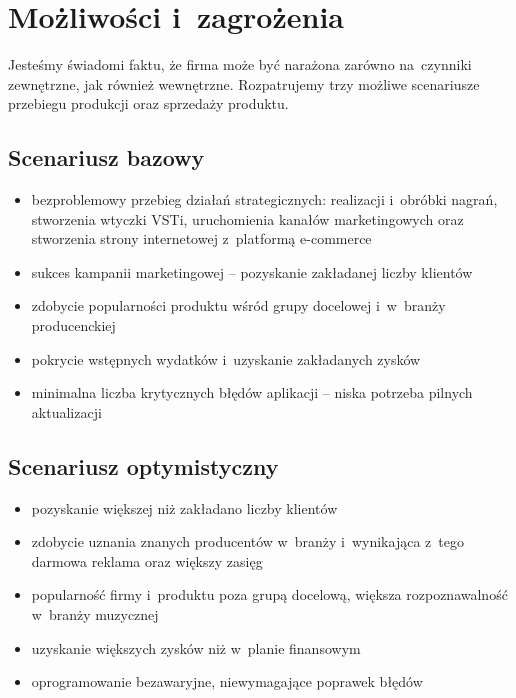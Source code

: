 \documentclass[12pt]{article}
\begin{document}
\section{Możliwości i~zagrożenia}


Jesteśmy świadomi faktu, że firma może być narażona zarówno na~czynniki zewnętrzne, jak również wewnętrzne.
Rozpatrujemy trzy możliwe scenariusze przebiegu produkcji oraz sprzedaży produktu.

\subsection{Scenariusz bazowy}

\begin{itemize}
    \item bezproblemowy przebieg działań strategicznych: realizacji i~obróbki nagrań, stworzenia wtyczki VSTi, uruchomienia kanałów marketingowych oraz stworzenia strony internetowej z~platformą e-commerce
    \item sukces kampanii marketingowej -- pozyskanie zakładanej liczby klientów
    \item zdobycie popularności produktu wśród grupy docelowej i~w~branży producenckiej
    \item pokrycie wstępnych wydatków i~uzyskanie zakładanych zysków
    \item minimalna liczba krytycznych błędów aplikacji -- niska potrzeba pilnych aktualizacji
\end{itemize}

\subsection{Scenariusz optymistyczny}

\begin{itemize}
    \item pozyskanie większej niż zakładano liczby klientów
    \item zdobycie uznania znanych producentów w~branży i~wynikająca z~tego darmowa reklama oraz większy zasięg
    \item popularność firmy i~produktu poza grupą docelową, większa rozpoznawalność w~branży muzycznej
    \item uzyskanie większych zysków niż w~planie finansowym
    \item oprogramowanie bezawaryjne, niewymagające poprawek błędów
\end{itemize}
\end{document}
